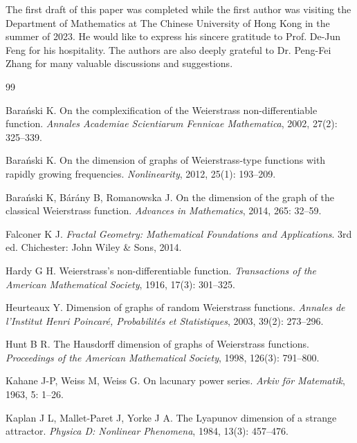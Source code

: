 \documentclass[12pt, reqno]{amsart}
\theoremstyle{plain}
\theoremstyle{definition}
\theoremstyle{remark}
\begin{document}
	
\bigskip

The first draft of this paper was completed while the first author was visiting the Department of Mathematics at The Chinese University of Hong Kong in the summer of 2023. He would like to express his sincere gratitude to Prof. De-Jun Feng for his hospitality. The authors are also deeply grateful to Dr. Peng-Fei Zhang for many valuable discussions and suggestions.
	
\bigskip

\begin{thebibliography}{99}
	
	Barański K. On the complexification of the Weierstrass non-differentiable function.
	\textit{Annales Academiae Scientiarum Fennicae Mathematica}, 2002, 27(2): 325--339.
	
	Barański K. On the dimension of graphs of Weierstrass-type functions with rapidly growing frequencies.
	\textit{Nonlinearity}, 2012, 25(1): 193--209.
	
	Barański K, Bárány B, Romanowska J. On the dimension of the graph of the classical Weierstrass function.
	\textit{Advances in Mathematics}, 2014, 265: 32--59.
	
		
	Falconer K J. \textit{Fractal Geometry: Mathematical Foundations and Applications}.
	3rd ed. Chichester: John Wiley \& Sons, 2014.
	
	Hardy G H. Weierstrass's non-differentiable function.
	\textit{Transactions of the American Mathematical Society}, 1916, 17(3): 301--325.
	
	Heurteaux Y. Dimension of graphs of random Weierstrass functions.
	\textit{Annales de l'Institut Henri Poincaré, Probabilités et Statistiques}, 2003, 39(2): 273--296.
	
	Hunt B R. The Hausdorff dimension of graphs of Weierstrass functions.
	\textit{Proceedings of the American Mathematical Society}, 1998, 126(3): 791--800.
	
	Kahane J-P, Weiss M, Weiss G. On lacunary power series.
	\textit{Arkiv för Matematik}, 1963, 5: 1--26.
	
	Kaplan J L, Mallet-Paret J, Yorke J A. The Lyapunov dimension of a strange attractor.
	\textit{Physica D: Nonlinear Phenomena}, 1984, 13(3): 457--476.
	

\end{thebibliography}
\end{document}
